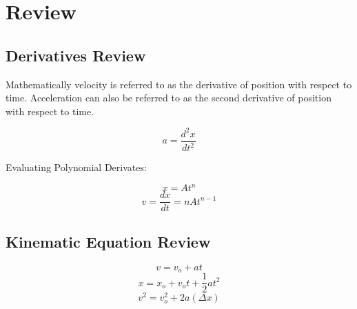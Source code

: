 \section{Review}

\subsection{Derivatives Review}
Mathematically velocity is referred to as the derivative of position with respect to time. Acceleration can also be referred to as the second derivative of position with respect to time.

\[a=\frac{d^2x}{dt^2}\]

\begin{center}
	Evaluating Polynomial Derivates:
\end{center}
\[x=At^n\]
\[v=\frac{dx}{dt}=nAt^{n-1}\]

\subsection{Kinematic Equation Review}
\[v=v_o+at\]
\[x=x_o+v_ot+\frac{1}{2}at^2\]
\[v^2=v^2_o+2a(\Delta x)\]